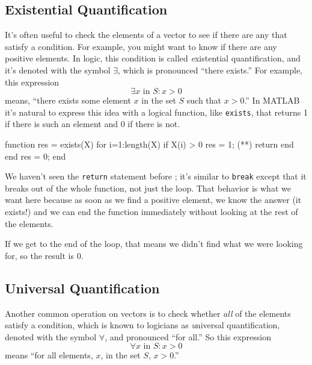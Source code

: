 \subsection{Existential Quantification}


It's often useful to check the elements of a vector to see if there
are any that satisfy a condition.  For example, you might want to
know if there are any positive elements.  In logic, this condition
is called {\emph existential quantification}, and it's denoted with
the symbol $\exists$, which is pronounced ``there exists.''  For example,
this expression
%
\[ \exists x \mbox{~in~} S: x>0  \]
%
means, ``there exists some element $x$ in the set $S$ such that
$x>0$.''  In MATLAB it's natural to express this idea with a logical
function, like {\tt exists}, that returns 1 if there is such an
element and 0 if there is not.

\begin{code}
function res = exists(X)
    for i=1:length(X)
        if X(i) > 0
            res = 1;
(**)            return
        end
    end
    res = 0;
end
\end{code}

We haven't seen the {\tt return} statement before ; it's similar
to {\tt break} except that it breaks out of the whole function, not
just the loop.  That behavior is what we want here because as soon
as we find a positive element, we know the answer (it exists!) and
we can end the function immediately without looking at the rest
of the elements.


If we get to the end of the loop, that means we didn't find what
we were looking for, so the result is 0.

\subsection{Universal Quantification}


Another common operation on vectors is to check whether {\em all}
of the elements satisfy a condition, which is known to
logicians as {\emph universal quantification}, denoted with
the symbol $\forall$, and pronounced ``for all.''  So this
expression
%
\[ \forall x \mbox{~in~} S: x>0 \]
%
means ``for all elements, $x$, in the set $S$, $x>0$.''

